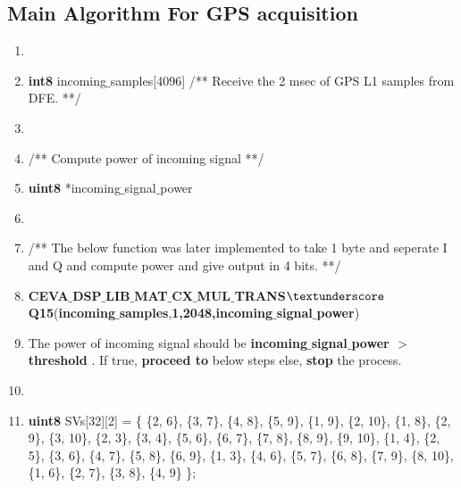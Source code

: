 \documentclass[journal,10pt,onecolumn]{article}
\begin{document}
\subsection{Main Algorithm For GPS acquisition}

\begin{enumerate}
    \item[]
    \item \textbf{int8} incoming$\_$samples[4096]  /** Receive the 2 msec of GPS L1 samples from DFE. **/
    \item[]
    \item[] /** Compute power of incoming signal **/
    \item \textbf{uint8} *incoming$\_$signal$\_$power
    \item[]
    \item[] /** The below function was later implemented to take 1 byte and seperate I and Q and compute power and give output in 4 bits. **/
    \item \textbf{CEVA$\_$DSP$\_$LIB$\_$MAT$\_$CX$\_$MUL$\_$TRANS$\textunderscore$Q15}(\textbf{incoming$\_$samples},\textbf{1,2048,incoming$\_$signal$\_$power}) 
    \item  The power of incoming signal should be \textbf{ incoming$\_$signal$\_$power $>$ threshold} . If true, \textbf{proceed to} below steps else, \textbf{stop} the process.
    \item[]
    \item \textbf{uint8} SVs[32][2] = \{
        \{2, 6\},
        \{3, 7\},
        \{4, 8\},
        \{5, 9\},
        \{1, 9\},
        \{2, 10\},
        \{1, 8\},
        \{2, 9\},
        \{3, 10\},
        \{2, 3\},
        \{3, 4\},
        \{5, 6\},
        \{6, 7\},
        \{7, 8\},
        \{8, 9\},
        \{9, 10\},
        \{1, 4\},
        \{2, 5\},
        \{3, 6\},
        \{4, 7\},
        \{5, 8\}, 
        \{6, 9\},
        \{1, 3\},
        \{4, 6\},
        \{5, 7\}, 
        \{6, 8\},
        \{7, 9\},
        \{8, 10\},
        \{1, 6\},
        \{2, 7\},
        \{3, 8\},
        \{4, 9\}
    \};
     

\end{enumerate}
\end{document}
